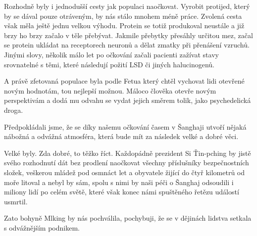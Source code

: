  Rozhodně byly i jednodušší cesty jak populaci naočkovat. Vyrobit protijed, který by se dával pouze otráveným, by nás stálo mnohem méně práce. Zvolená cesta však měla ještě jednu velkou výhodu. Protein se totiž produkoval neustále a již brzy ho brzy začalo v těle přebývat. Jakmile přebytky přesáhly určitou mez, začal se protein ukládat na receptorech neuronů a dělat zmatky při přenášení vzruchů. Jinými slovy, několik málo let po očkování začali pacienti zažívat stavy srovnatelné s těmi, které následují požití LSD či jiných halucinogenů.
 
A právě zfetovaná populace byla podle Fetua který chtěl vychovat lidi otevřené novým hodnotám, tou nejlepší možnou. Máloco člověka otevře novým perspektivám a dodá mu odvahu se vydat jejich směrem tolik, jako psychedelická droga. 

Předpokládali jsme, že se díky našemu očkování časem v Šanghaji utvoří nějaká nábožná a odvážná atmosféra, která bude mít za následek velké a dobré věci.

Velké byly. Zda dobré, to těžko říct. Každopádně prezident Si Ťin-pching by jistě svého rozhodnutí dát bez prodlení naočkovat všechny příslušníky bezpečnostních složek, veškerou mládež pod osmnáct let a obyvatele žijící do čtyř kilometrů od moře litoval a nebyl by sám, spolu s nimi by naši péči o Šanghaj odsoudili i miliony lidí po celém světě, které však konec námi spuštěného řetězu událostí usmrtil.

Zato bohyně Mlking by nás pochválila, pochybuji, že se v dějinách lidstva setkala s odvážnějším podnikem.
